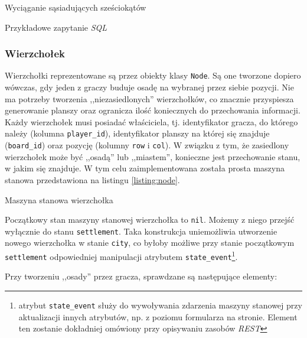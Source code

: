 \documentclass[a4paper,12pt]{article}
\begin{document}
\begin{listing}
  
  \caption{Wyciąganie sąsiadujących sześciokątów}
  \label{listing:hex}
\end{listing}

\begin{listing}
  
  \caption{Przykładowe zapytanie \emph{SQL}}
  \label{listing:find}
\end{listing}

\subsubsection{Wierzchołek}

Wierzchołki reprezentowane są przez obiekty klasy \texttt{Node}. Są
one tworzone dopiero wówczas, gdy jeden z graczy buduje osadę na
wybranej przez siebie pozycji. Nie ma potrzeby tworzenia
,,niezasiedlonych'' wierzchołków, co znacznie przyspiesza generowanie
planszy oraz ogranicza ilość koniecznych do przechowania
informacji. Każdy wierzchołek musi posiadać właściciela,
tj. identyfikator gracza, do którego należy (kolumna
\texttt{player\_id}), identyfikator planszy na której się znajduje
(\texttt{board\_id}) oraz pozycję (kolumny \texttt{row} i
\texttt{col}). W związku z tym, że zasiedlony wierzchołek może być
,,osadą'' lub ,,miastem'', konieczne jest przechowanie stanu, w jakim
się znajduje. W tym celu zaimplementowana została prosta maszyna
stanowa przedstawiona na listingu \ref{listing:node}.

\begin{listing}
  
  \caption{Maszyna stanowa wierzchołka}
  \label{listing:node}
\end{listing}

Początkowy stan maszyny stanowej wierzchołka to \texttt{nil}. Możemy z
niego przejść wyłącznie do stanu \texttt{settlement}. Taka konstrukcja
uniemożliwia utworzenie nowego wierzchołka w stanie \texttt{city}, co
byłoby możliwe przy stanie początkowym \texttt{settlement}
odpowiedniej manipulacji atrybutem
\texttt{state\_event}\footnote{atrybut \texttt{state\_event} służy do
  wywoływania zdarzenia maszyny stanowej przy aktualizacji innych
  atrybutów, np. z poziomu formularza na stronie. Element ten zostanie
  dokładniej omówiony przy opisywaniu zasobów \emph{REST}}.

Przy tworzeniu ,,osady'' przez gracza, sprawdzane są następujące
elementy:
\end{document}
